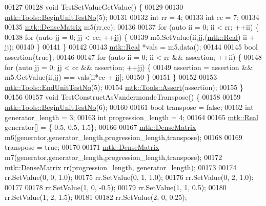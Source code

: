 \begin{DoxyCode}
00127 
00128 \textcolor{keywordtype}{void} TestSetValueGetValue() \{
00129 
00130   \hyperlink{classmtk_1_1Tools_afc29ecaf337a13ed2e817d3890a5a441}{mtk::Tools::BeginUnitTestNo}(5);
00131 
00132   \textcolor{keywordtype}{int} rr = 4;
00133   \textcolor{keywordtype}{int} cc = 7;
00134 
00135   \hyperlink{classmtk_1_1DenseMatrix}{mtk::DenseMatrix} m5(rr,cc);
00136 
00137   \textcolor{keywordflow}{for} (\textcolor{keyword}{auto} ii = 0; ii < rr; ++ii) \{
00138     \textcolor{keywordflow}{for} (\textcolor{keyword}{auto} jj = 0; jj < cc; ++jj) \{
00139       m5.SetValue(ii,jj,(\hyperlink{group__c01-roots_gac080bbbf5cbb5502c9f00405f894857d}{mtk::Real}) ii + jj);
00140     \}
00141   \}
00142 
00143   \hyperlink{group__c01-roots_gac080bbbf5cbb5502c9f00405f894857d}{mtk::Real} *vals = m5.data();
00144 
00145   \textcolor{keywordtype}{bool} assertion\{\textcolor{keyword}{true}\};
00146 
00147   \textcolor{keywordflow}{for} (\textcolor{keyword}{auto} ii = 0; ii < rr && assertion; ++ii) \{
00148     \textcolor{keywordflow}{for} (\textcolor{keyword}{auto} jj = 0; jj < cc  && assertion; ++jj) \{
00149       assertion = assertion && m5.GetValue(ii,jj) == vals[ii*cc + jj];
00150     \}
00151   \}
00152 
00153   \hyperlink{classmtk_1_1Tools_aba67d9dc35c9c1c49430fcc9ea035e03}{mtk::Tools::EndUnitTestNo}(5);
00154   \hyperlink{classmtk_1_1Tools_ac6804df469c94ab6a796fb64f1e44a89}{mtk::Tools::Assert}(assertion);
00155 \}
00156 
00157 \textcolor{keywordtype}{void} TestConstructAsVandermondeTranspose() \{
00158 
00159   \hyperlink{classmtk_1_1Tools_afc29ecaf337a13ed2e817d3890a5a441}{mtk::Tools::BeginUnitTestNo}(6);
00160 
00161   \textcolor{keywordtype}{bool} transpose = \textcolor{keyword}{false};
00162   \textcolor{keywordtype}{int} generator\_length = 3;
00163   \textcolor{keywordtype}{int} progression\_length = 4;
00164 
00165   \hyperlink{group__c01-roots_gac080bbbf5cbb5502c9f00405f894857d}{mtk::Real} generator[] = \{-0.5, 0.5, 1.5\};
00166 
00167   \hyperlink{classmtk_1_1DenseMatrix}{mtk::DenseMatrix} m6(generator,generator\_length,progression\_length,transpose);
00168 
00169   transpose = \textcolor{keyword}{true};
00170 
00171   \hyperlink{classmtk_1_1DenseMatrix}{mtk::DenseMatrix} m7(generator,generator\_length,progression\_length,transpose);
00172   \hyperlink{classmtk_1_1DenseMatrix}{mtk::DenseMatrix} rr(progression\_length, generator\_length);
00173 
00174   rr.SetValue(0, 0, 1.0);
00175   rr.SetValue(0, 1, 1.0);
00176   rr.SetValue(0, 2, 1.0);
00177 
00178   rr.SetValue(1, 0, -0.5);
00179   rr.SetValue(1, 1, 0.5);
00180   rr.SetValue(1, 2, 1.5);
00181 
00182   rr.SetValue(2, 0, 0.25);

\end{DoxyCode}
